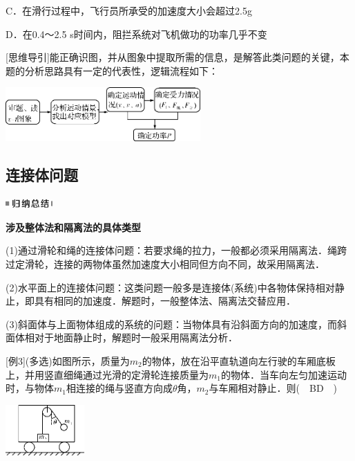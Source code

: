 C．在滑行过程中，飞行员所承受的加速度大小会超过2.5g

D．在0.4～2.5 s时间内，阻拦系统对飞机做功的功率几乎不变

{[}思维导引{]}能正确识图，并从图象中提取所需的信息，是解答此类问题的关键，本题的分析思路具有一定的代表性，逻辑流程如下：

\begin{center}\includegraphics[width=2.9375in,height=0.8125in]{media/image118.png}\end{center}
\newpage
\subsection{连接体问题}

\begin{center}\includegraphics[width=0.70833in,height=0.125in]{media/image13.png}

\textbf{涉及整体法和隔离法的具体类型}
\end{center}


(1)通过滑轮和绳的连接体问题：若要求绳的拉力，一般都必须采用隔离法．绳跨过定滑轮，连接的两物体虽然加速度大小相同但方向不同，故采用隔离法．

(2)水平面上的连接体问题：这类问题一般多是连接体(系统)中各物体保持相对静止，即具有相同的加速度．解题时，一般整体法、隔离法交替应用．

(3)斜面体与上面物体组成的系统的问题：当物体具有沿斜面方向的加速度，而斜面体相对于地面静止时，解题时一般采用隔离法分析．

{[}例3{]}(多选)如图所示，质量为$m_2$的物体，放在沿平直轨道向左行驶的车厢底板上，并用竖直细绳通过光滑的定滑轮连接质量为$m_1$的物体．当车向左匀加速运动时，与物体$m_1$相连接的绳与竖直方向成$\theta$角，$m_2$与车厢相对静止．则(　BD　)

\begin{center}\includegraphics[width=1.1875in,height=0.76042in]{media/image119.png}\end{center}

